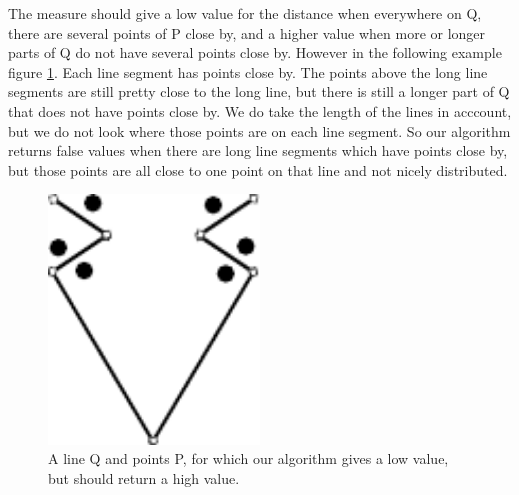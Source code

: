 \documentclass[a4paper,11pt]{article}
\begin{document}
The measure should give a low value for the distance when everywhere on Q, there are several points of P close by, and a higher value when more or longer parts of Q do not have several points close by.
However in the following example figure \ref{fig:example}. Each line segment has points close by. 
The points above the long line segments are still pretty close to the long line, but there is still a longer part of Q that does not have points close by. 
We do take the length of the lines in acccount, but we do not look where those points are on each line segment. 
So our algorithm returns false values when there are long line segments which have points close by, but those points are all close to one point on that line and not nicely distributed. 
\begin{figure}[H]
	\centering
	\label{fig:example}
	\includegraphics[width=0.5\textwidth]{img/example1.pdf}
	\caption{A line Q and points P, for which our algorithm gives a low value, but should return a high value.}
\end{figure}
\end{document}
